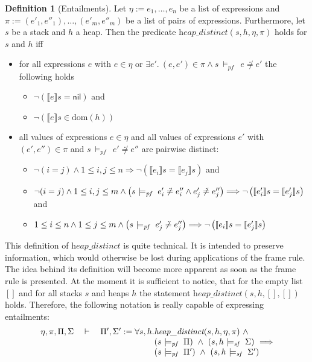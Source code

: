 \documentclass{scrartcl}
\theoremstyle{definition}
\newtheorem{definition}{Definition}
\newcommand{\nil}{{\textsf{nil}}}
\newcommand{\pfunequal}[2]{\ensuremath{#1 \not\doteq #2}}
\newcommand{\modelspf}{{\models_{\textit{pf}}\ }}
\newcommand{\modelssf}{{\models_{\textit{sf}}\ }}
\newcommand{\varel}{\eta}
\newcommand{\varepl}{\pi}
\newcommand{\heapdistinct}{\textit{heap\_distinct}}
\newcommand{\entailment}[2]{#1 \quad\vdash\quad #2}
\newcommand{\dom}{{\text{dom}}}
\begin{document}
\begin{definition}[Entailments]
  Let $\varel := e_1, \ldots, e_n$ be a list of expressions and
  $\varepl := (e'_1, e''_1), \ldots, (e'_m, e''_m)$ be a list of pairs of
  expressions. Furthermore, let $s$ be a stack and $h$ a heap. Then the predicate
  $\heapdistinct (s, h, \varel, \varepl)$ holds for $s$ and $h$
  iff
  \begin{itemize}
  \item for all expressions $e$ with $e \in \varel$ or $\exists e'.\ (e, e')
    \in \varepl \wedge s\ \modelspf\ \pfunequal {e} {e'}$ the following holds
    \begin{itemize}
    \item $\neg \left(\llbracket e \rrbracket s = \nil\right)$ and
    \item $\neg \left(\llbracket e \rrbracket s \in \dom(h)\right)$
    \end{itemize}
  \item all values of expressions $e \in \varel$ and all values of
    expressions $e'$ with $(e',e'') \in \varepl$ and $s\ \modelspf\ \pfunequal {e'} {e''}$
    are pairwise distinct:
    \begin{itemize}
    \item $\neg (i = j) \wedge 1 \leq i,j \leq n  \Longrightarrow \neg \left(\llbracket e_i \rrbracket s = \llbracket e_j \rrbracket
        s\right)$ and
    \item $\neg (i = j) \wedge 1 \leq i,j \leq m \wedge \left(s\ \modelspf\ \pfunequal {e'_i} {e''_i} \wedge \pfunequal {e'_j}
      {e''_j}\right) \Longrightarrow \\\neg \left(\llbracket e'_i \rrbracket s
      = \llbracket e'_j \rrbracket s\right)$ and
    \item $1 \leq i \leq n \wedge 1 \leq j \leq m \wedge \left(s\ \modelspf\ \pfunequal {e'_j}
      {e''_j}\right) \Longrightarrow \\\neg \left(\llbracket e_i \rrbracket s = \llbracket e'_j \rrbracket s\right)$
    \end{itemize}  
  \end{itemize}

  This definition of $\heapdistinct$ is quite technical. It is intended to
  preserve information, which would otherwise be lost during applications of
  the frame rule. The idea behind its definition will become more
  apparent as soon as the frame rule is presented. At the moment it is
  sufficient to notice, that for the empty list $[]$ and for all stacks $s$
  and heaps $h$ the statement $\heapdistinct (s, h, [], [])$ holds. Therefore,
  the following notation is really capable of expressing entailments:
\[
\setlength{\arraycolsep}{0pt}
\begin{array}{ll}
  \entailment{\varel, \varepl, \Pi, \Sigma}{\Pi', \Sigma'} := \forall s, h.&
  \heapdistinct(s, h, \varel, \varepl)\ \wedge \\
  &\left(s\ \modelspf\ \Pi\right)\ \wedge\ 
\left(s,h\ \modelssf\ \Sigma\right)\ \Longrightarrow \\
&\left(s\ \modelspf\ \Pi'\right)\ \wedge\ \left(s,h\ \modelssf\ \Sigma'\right)
\end{array}
\]
\end{definition}
\end{document}

